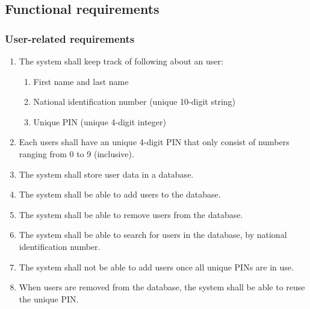 \documentclass[12pt,titlepage,bibliography=totoc]{article}
\begin{document}
\subsection{Functional requirements}
\subsubsection{User-related requirements}
\begin{enumerate}
	\item The system shall keep track of following about an user:
	\begin{enumerate}
		\item First name and last name
		\item National identification number (unique 10-digit string)
		\item Unique PIN (unique 4-digit integer)
	\end{enumerate}
	\item Each users shall have an unique 4-digit PIN that only consist of numbers ranging from 0 to 9 (inclusive).
	\item The system shall store user data in a database.
	\item The system shall be able to add users to the database.
	\item The system shall be able to remove users from the database.
	\item The system shall be able to search for users in the database, by national identification number.
	\item The system shall not be able to add users once all unique PINs are in use.
	\item When users are removed from the database, the system shall be able to reuse the unique PIN.
\end{enumerate}
\end{document}
